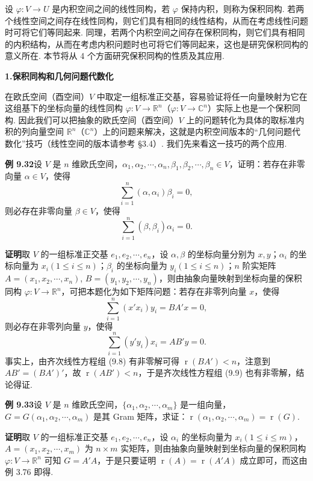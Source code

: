 \documentclass[UTF8, 12pt, fontset=fandol, oneside]{ctexart}
\begin{document}
设 $\varphi:V\to U$ 是内积空间之间的线性同构，若 $\varphi$ 保持内积，则称为保积同构. 若两个线性空间之间存在线性同构，则它们具有相同的线性结构，从而在考虑线性问题时可将它们等同起来. 同理，若两个内积空间之间存在保积同构，则它们具有相同的内积结构，从而在考虑内积问题时也可将它们等同起来，这也是研究保积同构的意义所在. 本节将从 4 个方面研究保积同构的性质及其应用.

\noindent\textbf{1.\quad 保积同构和几何问题代数化}

在欧氏空间（酉空间）$V$ 中取定一组标准正交基，容易验证将任一向量映射为它在这组基下的坐标向量的线性同构 $\varphi:V\to\mathbb{R}^n$（$\varphi:V\to\mathbb{C}^n$）实际上也是一个保积同构. 因此我们可以把抽象的欧氏空间（酉空间）$V$ 上的问题转化为具体的取标准内积的列向量空间 $\mathbb{R}^n$（$\mathbb{C}^n$）上的问题来解决，这就是内积空间版本的“几何问题代数化”技巧（线性空间的版本请参考 §3.4）. 我们先来看这一技巧的两个应用.

\noindent\textbf{例 9.32}\quad 设 $V$ 是 $n$ 维欧氏空间，$\alpha_1,\alpha_2,\cdots,\alpha_n,\beta_1,\beta_2,\cdots,\beta_n\in V$，证明：若存在非零向量 $\alpha\in V$，使得
\[
\sum_{i=1}^n(\alpha,\alpha_i)\beta_i=0,
\]
则必存在非零向量 $\beta\in V$，使得
\[
\sum_{i=1}^n(\beta,\beta_i)\alpha_i=0.
\]

\noindent\textbf{证明}\quad 取 $V$ 的一组标准正交基 $e_1,e_2,\cdots,e_n$，设 $\alpha,\beta$ 的坐标向量分别为 $x,y$；$\alpha_i$ 的坐标向量为 $x_i(1\le i\le n)$；$\beta_i$ 的坐标向量为 $y_i(1\le i\le n)$；$n$ 阶实矩阵 $A=(x_1,x_2,\cdots,x_n)$, $B=(y_1,y_2,\cdots,y_n)$，则由抽象向量映射到坐标向量的保积同构 $\varphi:V\to\mathbb{R}^n$，可把本题化为如下矩阵问题：若存在非零列向量 $x$，使得
\begin{equation}
\sum_{i=1}^n(x'x_i)y_i=BA'x=0,
\tag{9.8}
\end{equation}
则必存在非零列向量 $y$，使得
\begin{equation}
\sum_{i=1}^n(y'y_i)x_i=AB'y=0.
\tag{9.9}
\end{equation}
事实上，由齐次线性方程组 (9.8) 有非零解可得 $\operatorname{r}(BA')<n$，注意到 $AB'=(BA')'$，故 $\operatorname{r}(AB')<n$，于是齐次线性方程组 (9.9) 也有非零解，结论得证.

\noindent\textbf{例 9.33}\quad 设 $V$ 是 $n$ 维欧氏空间，$\{\alpha_1,\alpha_2,\cdots,\alpha_m\}$ 是一组向量，$G=G(\alpha_1,\alpha_2,\cdots,\alpha_m)$ 是其 Gram 矩阵，求证：$\operatorname{r}(\alpha_1,\alpha_2,\cdots,\alpha_m)=\operatorname{r}(G)$.

\noindent\textbf{证明}\quad 取 $V$ 的一组标准正交基 $e_1,e_2,\cdots,e_n$，设 $\alpha_i$ 的坐标向量为 $x_i(1\le i\le m)$，$A=(x_1,x_2,\cdots,x_m)$ 为 $n\times m$ 实矩阵，则由抽象向量映射到坐标向量的保积同构 $\varphi:V\to\mathbb{R}^n$ 可知 $G=A'A$，于是只要证明 $\operatorname{r}(A)=\operatorname{r}(A'A)$ 成立即可，而这由例 3.76 即得.
\end{document}
